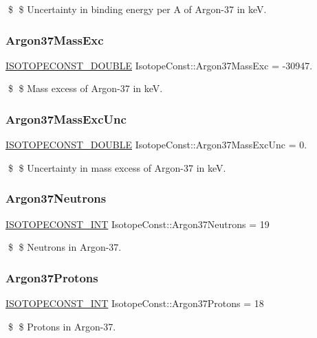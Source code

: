 \$ \$ Uncertainty in binding energy per A of Argon-\/37 in keV. \mbox{\label{group___isotope_const-_argon-_ar37_ga057d365de89237d64218f381c52cf889}} 
\subsubsection{\texorpdfstring{Argon37\+Mass\+Exc}{Argon37MassExc}}
{\footnotesize\ttfamily \mbox{\hyperlink{group___isotope_const-_macros_ga8f45a7272ce02c0b4c65c44636ed719a}{I\+S\+O\+T\+O\+P\+E\+C\+O\+N\+S\+T\+\_\+\+D\+O\+U\+B\+LE}} Isotope\+Const\+::\+Argon37\+Mass\+Exc = -\/30947.}

\$ \$ Mass excess of Argon-\/37 in keV. \mbox{\label{group___isotope_const-_argon-_ar37_gadb26c365b01b9d3883c2ee64654293e2}} 
\subsubsection{\texorpdfstring{Argon37\+Mass\+Exc\+Unc}{Argon37MassExcUnc}}
{\footnotesize\ttfamily \mbox{\hyperlink{group___isotope_const-_macros_ga8f45a7272ce02c0b4c65c44636ed719a}{I\+S\+O\+T\+O\+P\+E\+C\+O\+N\+S\+T\+\_\+\+D\+O\+U\+B\+LE}} Isotope\+Const\+::\+Argon37\+Mass\+Exc\+Unc = 0.}

\$ \$ Uncertainty in mass excess of Argon-\/37 in keV. \mbox{\label{group___isotope_const-_argon-_ar37_ga627048cc9230f0463569ca03c902e35f}} 
\subsubsection{\texorpdfstring{Argon37\+Neutrons}{Argon37Neutrons}}
{\footnotesize\ttfamily \mbox{\hyperlink{group___isotope_const-_macros_ga5f18360b3e99483a35c32d789e62621c}{I\+S\+O\+T\+O\+P\+E\+C\+O\+N\+S\+T\+\_\+\+I\+NT}} Isotope\+Const\+::\+Argon37\+Neutrons = 19}

\$ \$ Neutrons in Argon-\/37. \mbox{\label{group___isotope_const-_argon-_ar37_ga0f7a5fe794c85dbfb364e262bef03a20}} 
\subsubsection{\texorpdfstring{Argon37\+Protons}{Argon37Protons}}
{\footnotesize\ttfamily \mbox{\hyperlink{group___isotope_const-_macros_ga5f18360b3e99483a35c32d789e62621c}{I\+S\+O\+T\+O\+P\+E\+C\+O\+N\+S\+T\+\_\+\+I\+NT}} Isotope\+Const\+::\+Argon37\+Protons = 18}

\$ \$ Protons in Argon-\/37. 